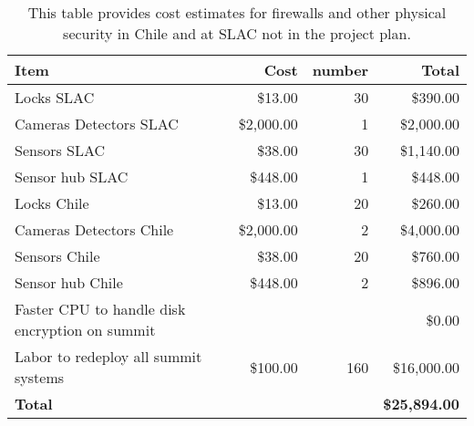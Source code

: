 \tiny \begin{longtable} {|p{}|r|r|r|} \caption{This table provides cost estimates for firewalls and other physical security in Chile and at SLAC not in the project plan. \label{tab:firewalls}}\\ 
\hline 
\textbf{Item}&\textbf{Cost}&\textbf{number}&\textbf{Total} \\ \hline
{Locks SLAC}&{\$13.00}&{30}&{\$390.00} \\ \hline
{Cameras Detectors  SLAC}&{\$2,000.00}&{1}&{\$2,000.00} \\ \hline
{Sensors SLAC}&{\$38.00}&{30}&{\$1,140.00} \\ \hline
{Sensor hub SLAC}&{\$448.00}&{1}&{\$448.00} \\ \hline
{Locks Chile}&{\$13.00}&{20}&{\$260.00} \\ \hline
{Cameras Detectors Chile}&{\$2,000.00}&{2}&{\$4,000.00} \\ \hline
{Sensors Chile}&{\$38.00}&{20}&{\$760.00} \\ \hline
{Sensor hub Chile}&{\$448.00}&{2}&{\$896.00} \\ \hline
{Faster CPU to handle disk encryption on summit}&{}&{}&{\$0.00} \\ \hline
{Labor to redeploy all summit systems}&{\$100.00}&{160}&{\$16,000.00} \\ \hline
\textbf{Total }&\textbf{}&\textbf{}&\textbf{\$25,894.00} \\ \hline
\end{longtable} \normalsize
